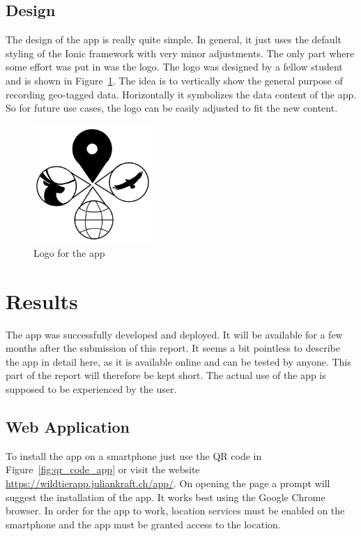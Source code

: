 \documentclass{josis}
\begin{document}
\subsection{Design}

The design of the app is really quite simple. In general, it just uses the default styling of the Ionic framework with very minor adjustments.
The only part where some effort was put in was the logo. The logo was designed by a fellow student and is shown in Figure~\ref{fig:logo}.
The idea is to vertically show the general purpose of recording geo-tagged data. Horizontally it symbolizes the data content of the app.
So for future use cases, the logo can be easily adjusted to fit the new content.
\begin{figure}[tbh]
    \centering
    \includegraphics[width=0.4\textwidth]{images/logo_app.png}
    \caption{Logo for the app}\label{fig:logo}
\end{figure}

\section{Results}

The app was successfully developed and deployed. It will be available for a few months after the submission of this report.
It seems a bit pointless to describe the app in detail here, as it is available online and can be tested by anyone.
This part of the report will therefore be kept short. The actual use of the app is supposed to be experienced by the user.

\subsection{Web Application}

To install the app on a smartphone just use the QR code in Figure~\ref{fig:qr_code_app} or visit 
the website \url{https://wildtierapp.juliankraft.ch/app/}. On opening the page a prompt will suggest the installation of the app.
It works best using the Google Chrome browser. In order for the app to work, location services must be enabled on the smartphone
and the app must be granted access to the location.
\end{document}
